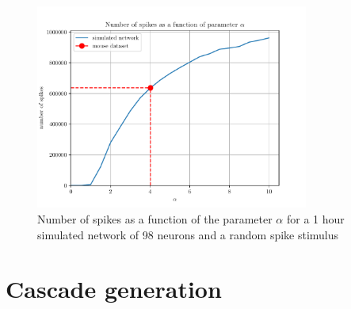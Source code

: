 \begin{figure}[H]
	\centering
	\includegraphics[width=0.8\textwidth]{I_var_plot.pdf}
	\caption{Number of spikes as a function of the parameter \(\alpha\) for a 1 hour simulated network of 98 neurons and a random spike stimulus}
	\label{fig:I_var_plot}
\end{figure}





\section{Cascade generation}\label{sec:simulating_cascade_generation}

